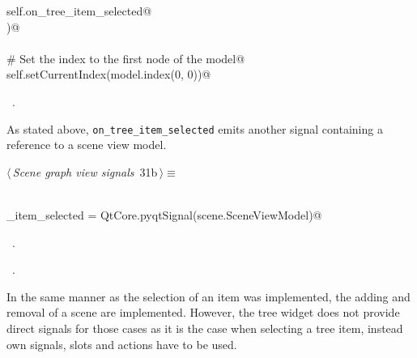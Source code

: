 \documentclass[
    a4paper,      %
    10pt,         %
    openright,    %
    notitlepage,  %
    parskip=half, %
]{scrreprt}       %
\theoremstyle{definition}                    %
\begin{document}
\begin{flushleft}
\begin{minipage}{\linewidth}
\begin{list}{}{}
\mbox{}\lstinline@        self.on_tree_item_selected@\\
\mbox{}\lstinline@    )@\\
\mbox{}\lstinline@@\\
\mbox{}\lstinline@    # Set the index to the first node of the model@\\
\mbox{}\lstinline@    self.setCurrentIndex(model.index(0, 0))@\\
\mbox{}\lstinline@@{\NWsep}
\end{list}
\vspace{-1.5ex}
\footnotesize
\begin{list}{}{\setlength{\itemsep}{-\parsep}\setlength{\itemindent}{-\leftmargin}}
\item \NWtxtMacroRefIn\ .

\item{}
\end{list}
\end{minipage}\vspace{4ex}
\end{flushleft}
As stated above, \verb+on_tree_item_selected+ emits another signal containing a
reference to a scene view model.

\begin{flushleft} \small
\begin{minipage}{\linewidth}\label{scrap32}\raggedright\small
{} $\langle\,${\itshape Scene graph view signals}\nobreak\ {\footnotesize {31b}}$\,\rangle\equiv$
\vspace{-1ex}
\begin{list}{}{} \item
\mbox{}\lstinline@@\\
\mbox{}\lstinline@tree_item_selected = QtCore.pyqtSignal(scene.SceneViewModel)@\\
\mbox{}\lstinline@@{\NWsep}
\end{list}
\vspace{-1.5ex}
\footnotesize
\begin{list}{}{\setlength{\itemsep}{-\parsep}\setlength{\itemindent}{-\leftmargin}}
\item \NWtxtMacroDefBy\ .
\item \NWtxtMacroRefIn\ .

\item{}
\end{list}
\end{minipage}\vspace{4ex}
\end{flushleft}
In the same manner as the selection of an item was implemented, the adding and
removal of a scene are implemented. However, the tree widget does not provide
direct signals for those cases as it is the case when selecting a tree item,
instead own signals, slots and actions have to be used.
\end{document}
